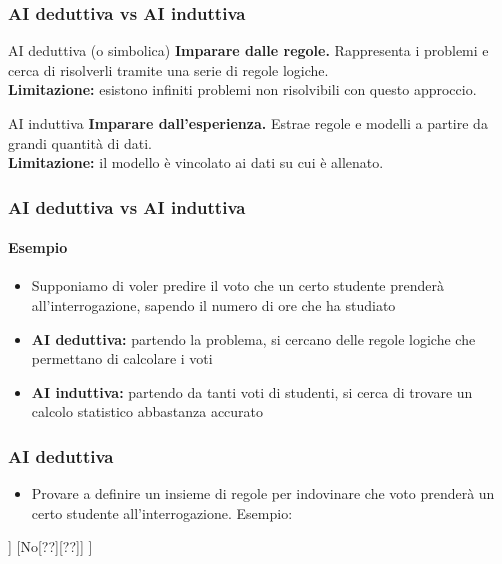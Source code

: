 \begin{contentframe}
    \frametitle{AI deduttiva vs AI induttiva}

    \begin{block}{AI deduttiva (o simbolica)}
        \textbf{Imparare dalle regole.}
        Rappresenta i problemi e cerca di risolverli tramite una serie di regole logiche.
        \\\textbf{Limitazione:} esistono infiniti problemi non risolvibili con questo approccio.
    \end{block}

    \begin{block}{AI induttiva}
        \textbf{Imparare dall'esperienza.}
        Estrae regole e modelli a partire da grandi quantità di dati.
        \\\textbf{Limitazione:} il modello è vincolato ai dati su cui è allenato.
    \end{block}
\end{contentframe}

\begin{contentframe}
    \frametitle{AI deduttiva vs AI induttiva}
    \framesubtitle{Esempio}

    \begin{itemize}
        \item Supponiamo di voler predire il voto che un certo studente prenderà all'interrogazione, sapendo il numero di ore che ha studiato

        \pause
        \bigskip
        \item \textbf{AI deduttiva:} partendo la problema, si cercano delle regole logiche che permettano di calcolare i voti
        \pause
        \item \textbf{AI induttiva:}  partendo da tanti voti di studenti, si cerca di trovare un calcolo statistico abbastanza accurato 
    \end{itemize}
\end{contentframe}

\begin{exerciseframe}
    \frametitle{AI deduttiva}

    \begin{itemize}
        \item Provare a definire un insieme di regole per indovinare che voto prenderà un certo studente all'interrogazione. Esempio:
    \end{itemize}

    \centering
    \smartarttree[
            Lo studente ha studiato?
            [Sì[??][??]]
            [No[??][??]]
        ]{}
\end{exerciseframe}


